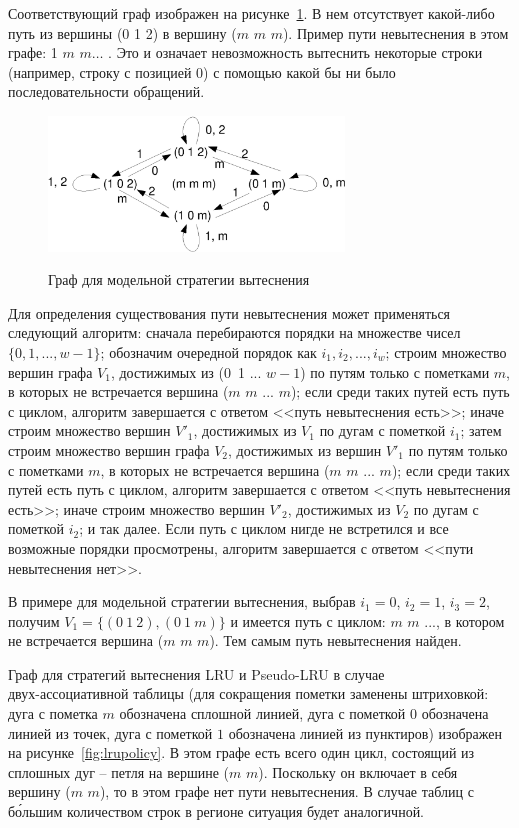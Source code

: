 \documentclass[14pt]{extreport}
\newcommand{\LRU}{\textsf{LRU}\xspace}
\newcommand{\PseudoLRU}{\textsf{Pseudo-LRU}\xspace}
\begin{document}
Соответствующий граф изображен на рисунке~\ref{badpolicy}. В нем
отсутствует какой-либо путь из вершины (0 1 2) в вершину ($m$ $m$
$m$). Пример пути невытеснения в этом графе: 1 $m$ $m \dots$ . Это и
означает невозможность вытеснить некоторые строки (например, строку с позицией 0) с помощью какой бы ни было последовательности обращений.
\begin{figure}[t]\center
  \includegraphics[width=0.7\textwidth]{2.theor/badpolicy}\\
  \caption{Граф для модельной стратегии вытеснения}\label{badpolicy}
\end{figure}

Для определения существования пути невытеснения может применяться
следующий алгоритм: сначала перебираются порядки на множестве чисел
$\{0, 1, ..., w{-}1\}$; обозначим очередной порядок как $i_1, i_2,
..., i_w$; строим множество вершин графа $V_1$, достижимых из (0~1
... $w{-}1$) по путям только с пометками $m$, в которых не встречается вершина ($m$ $m$ ... $m$); если среди таких путей есть путь с циклом,
алгоритм завершается с ответом <<путь невытеснения есть>>; иначе
строим множество вершин $V'_1$, достижимых из $V_1$ по дугам с
пометкой $i_1$; затем строим множество вершин графа $V_2$, достижимых из
вершин $V'_1$ по путям только с пометками $m$, в которых не встречается вершина ($m$ $m$ ... $m$); если среди таких путей есть путь с циклом,
алгоритм завершается с ответом <<путь невытеснения есть>>; иначе
строим множество вершин $V'_2$, достижимых из $V_2$ по дугам с
пометкой $i_2$; и так далее. Если путь с циклом нигде не встретился и все
возможные порядки просмотрены, алгоритм завершается с ответом <<пути
невытеснения нет>>.

В примере для модельной стратегии вытеснения, выбрав $i_1 = 0$, $i_2 = 1$, $i_3 = 2$, получим $V_1 = \{ (0~1~2), (0~1~m) \}$ и имеется путь с циклом: $m$ $m$ ..., в котором не встречается вершина ($m$ $m$ $m$). Тем самым путь невытеснения найден.

Граф для стратегий вытеснения \LRU и \PseudoLRU в случае\\двух-ассоциативной таблицы (для сокращения пометки заменены
штриховкой: дуга с пометка $m$ обозначена сплошной линией, дуга с
пометкой $0$ обозначена линией из точек, дуга с пометкой $1$
обозначена линией из пунктиров) изображен на
рисунке~\ref{fig:lrupolicy}. В этом графе есть всего один цикл,
состоящий из сплошных дуг -- петля на вершине ($m$ $m$). Поскольку он включает
в себя вершину ($m$ $m$), то в этом графе нет пути невытеснения.
В случае таблиц с б\'{о}льшим количеством строк в регионе ситуация будет
аналогичной.
\end{document}
